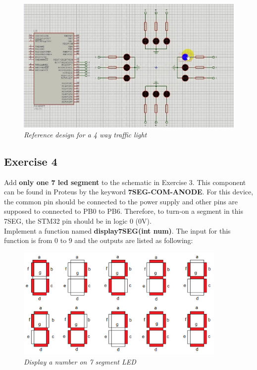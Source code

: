 \begin{figure}[H]
    \centering
    \includegraphics[width=5in]{source/picture/bai_1/pic2.jpg}
    \caption{\textit{Reference design for a 4 way traffic light}}
    \label{bai1_pic2}
\end{figure}

\subsection{Exercise 4}
Add \textbf{only one 7 led segment} to the schematic in Exercise 3. This component can be found in Proteus by the keyword \textbf{7SEG-COM-ANODE}. For this device, the common pin should be connected to the power supply and other pins are supposed to connected to PB0 to PB6. Therefore, to turn-on a segment in this 7SEG, the STM32 pin should be in logic 0 (0V).\\

Implement a function named \textbf{display7SEG(int num)}. The input for this function is from 0 to 9 and the outputs are listed as following:

\begin{figure}[H]
    \centering
    \includegraphics[width=4in]{source/picture/bai_1/pic3.PNG}
    \caption{\textit{Display a number on  7 segment LED}}
    \label{bai1_pic3}
\end{figure}


